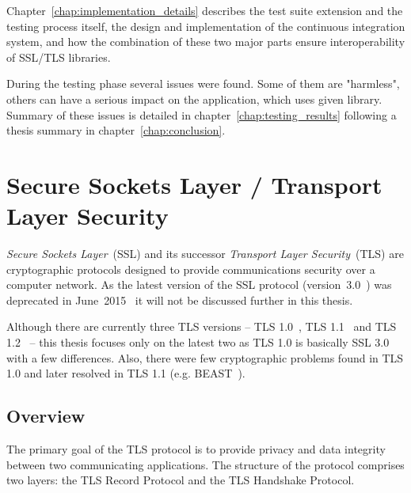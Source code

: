     Chapter~\ref{chap:implementation_details} describes the test suite extension
    and the testing process itself, the design and implementation of the continuous integration system,
    and how the combination of these two major parts ensure interoperability
    of SSL/TLS libraries.

    During the testing phase several issues were found. Some of them are "harmless",
    others can have a serious impact on the application, which uses given library.
    Summary of these issues is detailed in chapter~\ref{chap:testing_results}
    following a thesis summary in chapter~\ref{chap:conclusion}.


\chapter{Secure Sockets Layer / Transport Layer Security} \label{chap:ssl_tls}
    \textit{Secure Sockets Layer}~(SSL) and its successor
    \textit{Transport Layer Security}~(TLS) are cryptographic protocols
    designed to provide communications security over a computer network. As
    the latest version of the SSL protocol (version~3.0~\cite{rfc6101}) was
    deprecated in June~2015~\cite{rfc7568} it will not be discussed
    further in this thesis.

    Although there are currently three TLS versions -- TLS 1.0~\cite{rfc2246},
    TLS 1.1~\cite{rfc4346} and TLS 1.2~\cite{rfc5246} -- this thesis focuses
    only on the latest two as TLS 1.0 is basically SSL 3.0 with a few
    differences. Also, there were few cryptographic problems found
    in TLS 1.0 and later resolved in TLS 1.1 (e.g. BEAST~\cite{duong2011}).

\section{Overview}\label{ref:overview}
    The primary goal of the TLS protocol is to provide privacy and data
    integrity between two communicating applications. The structure of
    the protocol comprises two layers: the TLS Record Protocol and
    the TLS Handshake Protocol.

